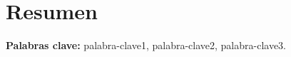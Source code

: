 \chapter*{Resumen}
	\lipsum[1] \lipsum[2] \lipsum[1] \lipsum[2] 
	
	\vspace{5mm}
	
	\noindent \textbf{Palabras clave:} palabra-clave1, palabra-clave2, palabra-clave3.